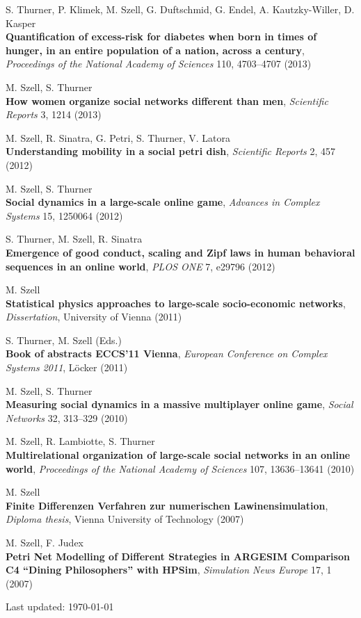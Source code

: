 \documentclass[10pt,a4paper]{article}
\begin{document}
\begin{etaremune}
\item S. Thurner, P. Klimek, M. Szell, G. Duftschmid, G. Endel, A. Kautzky-Willer, D. Kasper\\
    \textbf{Quantification of excess-risk for diabetes when born in times of hunger, in an entire population of a nation, across a century}, \textit{Proceedings of the National Academy of Sciences} 110, 4703--4707 (2013)
\item M. Szell, S. Thurner\\
    \textbf{How women organize social networks different than men}, \textit{Scientific Reports} 3, 1214 (2013)
\item M. Szell, R. Sinatra, G. Petri, S. Thurner, V. Latora\\
    \textbf{Understanding mobility in a social petri dish}, \textit{Scientific Reports} 2, 457 (2012)
\item M. Szell, S. Thurner\\
    \textbf{Social dynamics in a large-scale online game}, \textit{Advances in Complex Systems} 15, 1250064 (2012)
\item S. Thurner, M. Szell, R. Sinatra\\
    \textbf{Emergence of good conduct, scaling and Zipf laws in human behavioral sequences in an online world}, \textit{PLOS ONE} 7, e29796 (2012)
\item M. Szell\\
    \textbf{Statistical physics approaches to large-scale socio-economic networks}, \textit{Dissertation}, University of Vienna (2011)
\item S. Thurner, M. Szell (Eds.)\\
    \textbf{Book of abstracts ECCS{'}11 Vienna}, \textit{European Conference on Complex Systems 2011}, L\"ocker (2011)
\item M. Szell, S. Thurner\\
    \textbf{Measuring social dynamics in a massive multiplayer online game}, \textit{Social Networks} 32, 313--329 (2010)
\item M. Szell, R. Lambiotte, S. Thurner\\
    \textbf{Multirelational organization of large-scale social networks in an online world}, \textit{Proceedings of the National Academy of Sciences} 107, 13636--13641 (2010)
\item M. Szell\\
    \textbf{Finite Differenzen Verfahren zur numerischen Lawinensimulation}, \textit{Diploma thesis}, Vienna University of Technology (2007)
\item M. Szell, F. Judex\\
    \textbf{Petri Net Modelling of Different Strategies in ARGESIM Comparison C4 ``Dining Philosophers'' with HPSim}, \textit{Simulation News Europe} 17, 1 (2007)
\end{etaremune}



\bigskip

\begin{center}
  \begin{small}
    Last updated: \today
  \end{small}
\end{center}
\end{document}

